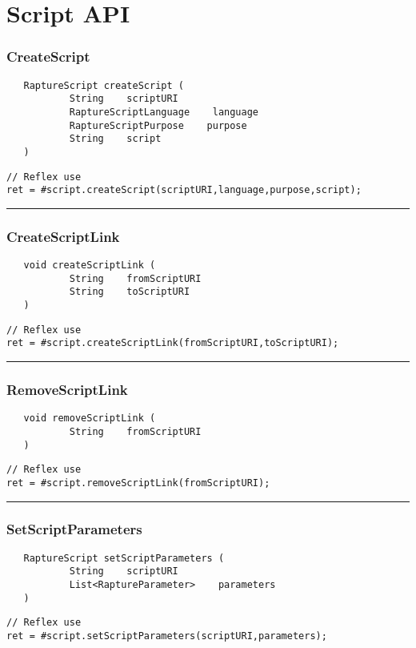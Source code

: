 \section{Script API}

\subsubsection{CreateScript}
\label{Api:CreateScript}
\begin{verbatim}
   RaptureScript createScript (
           String    scriptURI
           RaptureScriptLanguage    language
           RaptureScriptPurpose    purpose
           String    script
   )
\end{verbatim}
\begin{lstlisting}[language=reflex]
// Reflex use
ret = #script.createScript(scriptURI,language,purpose,script);
\end{lstlisting}



\rule{15cm}{2pt}
\subsubsection{CreateScriptLink}
\label{Api:CreateScriptLink}
\begin{verbatim}
   void createScriptLink (
           String    fromScriptURI
           String    toScriptURI
   )
\end{verbatim}
\begin{lstlisting}[language=reflex]
// Reflex use
ret = #script.createScriptLink(fromScriptURI,toScriptURI);
\end{lstlisting}



\rule{15cm}{2pt}
\subsubsection{RemoveScriptLink}
\label{Api:RemoveScriptLink}
\begin{verbatim}
   void removeScriptLink (
           String    fromScriptURI
   )
\end{verbatim}
\begin{lstlisting}[language=reflex]
// Reflex use
ret = #script.removeScriptLink(fromScriptURI);
\end{lstlisting}



\rule{15cm}{2pt}
\subsubsection{SetScriptParameters}
\label{Api:SetScriptParameters}
\begin{verbatim}
   RaptureScript setScriptParameters (
           String    scriptURI
           List<RaptureParameter>    parameters
   )
\end{verbatim}
\begin{lstlisting}[language=reflex]
// Reflex use
ret = #script.setScriptParameters(scriptURI,parameters);
\end{lstlisting}



